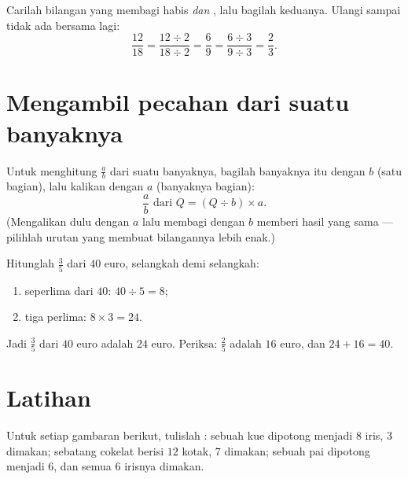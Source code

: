 \begin{method}\label{met:g6:fractions:simplify}
Carilah bilangan yang membagi habis  \emph{dan} ,
lalu bagilah keduanya. Ulangi sampai tidak ada  bersama lagi:
\[
\frac{12}{18} = \frac{12 \div 2}{18 \div 2} = \frac{6}{9}
= \frac{6 \div 3}{9 \div 3} = \frac{2}{3}.
\]
\end{method}

\section{Mengambil pecahan dari suatu banyaknya}

\begin{method}\label{met:g6:fractions:ofquantity}
Untuk menghitung $\frac ab$ dari suatu banyaknya, bagilah banyaknya itu
dengan $b$ (satu bagian), lalu kalikan dengan $a$ (banyaknya bagian):
\[
\frac ab \text{ dari } Q = (Q \div b) \times a .
\]
(Mengalikan dulu dengan $a$ lalu membagi dengan $b$ memberi hasil yang
sama --- pilihlah urutan yang membuat bilangannya lebih enak.)
\end{method}

\begin{example}\label{ex:g6:fractions:ofquantity}
Hitunglah $\frac35$ dari $40$ euro, selangkah demi selangkah:
\begin{enumerate}
  \item seperlima dari $40$: $40 \div 5 = 8$;
  \item tiga perlima: $8 \times 3 = 24$.
\end{enumerate}
Jadi $\frac35$ dari $40$ euro adalah $24$ euro. Periksa: 
$\frac25$ adalah $16$ euro, dan $24 + 16 = 40$.
\end{example}

\section{Latihan}

\begin{exercise}[$\star$]\label{exo:g6:fractions:1}
Untuk setiap gambaran berikut, tulislah : sebuah kue
dipotong menjadi $8$ iris, $3$ dimakan; sebatang cokelat berisi $12$
kotak, $7$ dimakan; sebuah pai dipotong menjadi $6$, dan semua $6$ irisnya dimakan.
\end{exercise}

